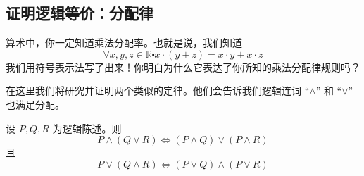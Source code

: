\subsection{证明逻辑等价：分配律}

算术中，你一定知道乘法分配率。也就是说，我们知道
\[\forall x, y, z \in \mathbb{R} \centerdot x \cdot (y + z) = x \cdot y + x \cdot z\]
我们用符号表示法写了出来！你明白为什么它表达了你所知的乘法分配律规则吗？

在这里我们将研究并证明两个类似的定律。他们会告诉我们逻辑连词 ``$\land$'' 和 ``$\lor$'' 也满足分配。

\begin{theorem}
    设 $P, Q, R$ 为逻辑陈述。则
    \[P \land (Q \lor R) \iff (P \land Q) \lor (P \land R)\]
    且
    \[P \lor (Q \land R) \iff (P \lor Q) \land (P \lor R)\]
\end{theorem}

